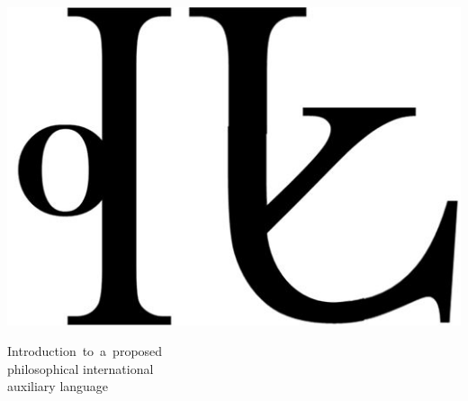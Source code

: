 \documentclass[12pt, a5]{article}
\begin{document}
\thispagestyle{empty}
\setcounter{page}{-1}
\begin{center}
\includegraphics[scale=0.6]{../Images/LogoAtlan.jpeg}

\end{center}
\begin{center}
        \hspace{0.7cm}

	
	\fontsize{21}{23}\selectfont \hspace{12.3pt}\font=4.3pt Introduction\ to\ a\ proposed \\\hspace{0.5cm}philosophical \hspace{0.00cm}international \\auxiliary language
\end{center}
\end{document}
